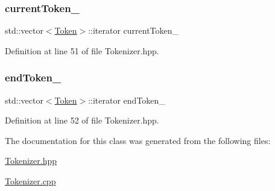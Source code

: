 \subsubsection{\texorpdfstring{current\+Token\+\_\+}{currentToken\_}}
{\footnotesize\ttfamily std\+::vector$<$\hyperlink{classft_1_1_token}{Token}$>$\+::iterator current\+Token\+\_\+\hspace{0.3cm}{\ttfamily [private]}}



Definition at line 51 of file Tokenizer.\+hpp.

\mbox{\label{classft_1_1_tokenizer_a538ba3ab8ee1d0cef5cc3c999f3ab44c}} 
\subsubsection{\texorpdfstring{end\+Token\+\_\+}{endToken\_}}
{\footnotesize\ttfamily std\+::vector$<$\hyperlink{classft_1_1_token}{Token}$>$\+::iterator end\+Token\+\_\+\hspace{0.3cm}{\ttfamily [private]}}



Definition at line 52 of file Tokenizer.\+hpp.



The documentation for this class was generated from the following files\+:\begin{DoxyCompactItemize}
\item 
\hyperlink{_tokenizer_8hpp}{Tokenizer.\+hpp}\item 
\hyperlink{_tokenizer_8cpp}{Tokenizer.\+cpp}\end{DoxyCompactItemize}
